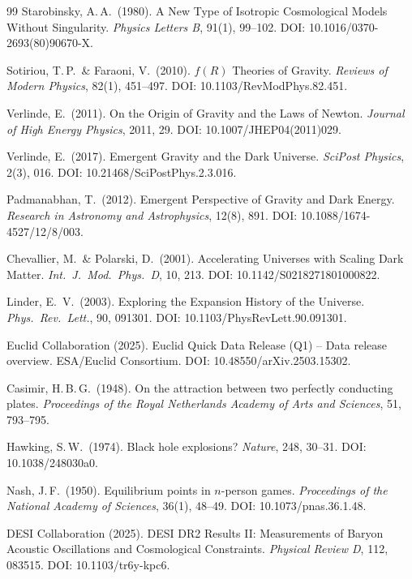 \documentclass[aps,prd,twocolumn,superscriptaddress,nofootinbib]{revtex4-2}
\begin{document}
\begin{thebibliography}{99}
Starobinsky, A.\,A.\ (1980).
A New Type of Isotropic Cosmological Models Without Singularity.
\textit{Physics Letters B}, 91(1), 99--102.
DOI: 10.1016/0370-2693(80)90670-X.

Sotiriou, T.\,P.\ \& Faraoni, V.\ (2010).
$f(R)$ Theories of Gravity.
\textit{Reviews of Modern Physics}, 82(1), 451--497.
DOI: 10.1103/RevModPhys.82.451.

Verlinde, E.\ (2011).
On the Origin of Gravity and the Laws of Newton.
\textit{Journal of High Energy Physics}, 2011, 29.
DOI: 10.1007/JHEP04(2011)029.

Verlinde, E.\ (2017).
Emergent Gravity and the Dark Universe.
\textit{SciPost Physics}, 2(3), 016.
DOI: 10.21468/SciPostPhys.2.3.016.

Padmanabhan, T.\ (2012).
Emergent Perspective of Gravity and Dark Energy.
\textit{Research in Astronomy and Astrophysics}, 12(8), 891.
DOI: 10.1088/1674-4527/12/8/003.

Chevallier, M.\ \& Polarski, D.\ (2001).
Accelerating Universes with Scaling Dark Matter.
\textit{Int.\ J.\ Mod.\ Phys.\ D}, 10, 213.
DOI: 10.1142/S0218271801000822.

Linder, E.~V.\ (2003).
Exploring the Expansion History of the Universe.
\textit{Phys.\ Rev.\ Lett.}, 90, 091301.
DOI: 10.1103/PhysRevLett.90.091301.

Euclid Collaboration (2025).
Euclid Quick Data Release (Q1) -- Data release overview.
ESA/Euclid Consortium.
DOI: 10.48550/arXiv.2503.15302.

Casimir, H.\,B.\,G.\ (1948).
On the attraction between two perfectly conducting plates.
\textit{Proceedings of the Royal Netherlands Academy of Arts and Sciences}, 51, 793--795.

Hawking, S.\,W.\ (1974).
Black hole explosions?
\textit{Nature}, 248, 30--31.
DOI: 10.1038/248030a0.

Nash, J.\,F.\ (1950).
Equilibrium points in $n$-person games.
\textit{Proceedings of the National Academy of Sciences}, 36(1), 48--49.
DOI: 10.1073/pnas.36.1.48.

DESI Collaboration (2025).
DESI DR2 Results II: Measurements of Baryon Acoustic Oscillations and Cosmological Constraints.
\textit{Physical Review D}, 112, 083515.
DOI: 10.1103/tr6y-kpc6.


\end{thebibliography}
\end{document}
